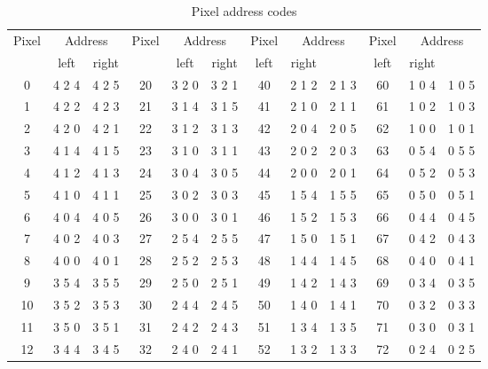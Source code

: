 \begin{table}[p]
\caption{Pixel address codes}
{\footnotesize
    \begin{center}
\begin{tabular}{ccc|ccc|ccc|ccc}
	\toprule
	Pixel & \multicolumn{2}{c|}{Address} & Pixel & \multicolumn{2}{c|}{Address} & Pixel & \multicolumn{2}{c|}{Address} & Pixel & \multicolumn{2}{c}{Address} \\
	      & left & right &  & left & right & left & right &  & left & right \\
	\midrule
	0   &	4   2	4   &	4   2	5   &	20  &	3   2	0   &	3   2	1   &	40  &	2   1	2   &	2   1	3   &	60  &	1   0	4   &	1   0	5   \\
	1   &	4   2	2   &	4   2	3   &	21  &	3   1	4   &	3   1	5   &	41  &	2   1	0   &	2   1	1   &	61  &	1   0	2   &	1   0	3   \\
	2   &	4   2	0   &	4   2	1   &	22  &	3   1	2   &	3   1	3   &	42  &	2   0	4   &	2   0	5   &	62  &	1   0	0   &	1   0	1   \\
	3   &	4   1	4   &	4   1	5   &	23  &	3   1	0   &	3   1	1   &	43  &	2   0	2   &	2   0	3   &	63  &	0   5	4   &	0   5	5   \\
	4   &	4   1	2   &	4   1	3   &	24  &	3   0	4   &	3   0	5   &	44  &	2   0	0   &	2   0	1   &	64  &	0   5	2   &	0   5	3   \\
	5   &	4   1	0   &	4   1	1   &	25  &	3   0	2   &	3   0	3   &	45  &	1   5	4   &	1   5	5   &	65  &	0   5	0   &	0   5	1   \\
	6   &	4   0	4   &	4   0	5   &	26  &	3   0	0   &	3   0	1   &	46  &	1   5	2   &	1   5	3   &	66  &	0   4	4   &	0   4	5   \\
	7   &	4   0	2   &	4   0	3   &	27  &	2   5	4   &	2   5	5   &	47  &	1   5	0   &	1   5	1   &	67  &	0   4	2   &	0   4	3   \\
	8   &	4   0	0   &	4   0	1   &	28  &	2   5	2   &	2   5	3   &	48  &	1   4	4   &	1   4	5   &	68  &	0   4	0   &	0   4	1   \\
	9   &	3   5	4   &	3   5	5   &	29  &	2   5	0   &	2   5	1   &	49  &	1   4	2   &	1   4	3   &	69  &	0   3	4   &	0   3	5   \\
	10  &	3   5	2   &	3   5	3   &	30  &	2   4	4   &	2   4	5   &	50  &	1   4	0   &	1   4	1   &	70  &	0   3	2   &	0   3	3   \\
	11  &	3   5	0   &	3   5	1   &	31  &	2   4	2   &	2   4	3   &	51  &	1   3	4   &	1   3	5   &	71  &	0   3	0   &	0   3	1   \\
	12  &	3   4	4   &	3   4	5   &	32  &	2   4	0   &	2   4	1   &	52  &	1   3	2   &	1   3	3   &	72  &	0   2	4   &	0   2	5   \\

\end{tabular}
\end{center}}
\end{table}
